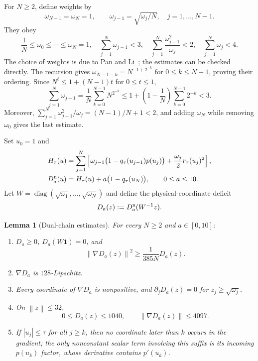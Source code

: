 \documentclass[11pt,a4paper]{article}
\newcommand{\norm}[1]{\left\lVert #1\right\rVert}
\newcommand{\one}{\mathbf 1}
\newcommand{\diag}{\operatorname{diag}}
\newtheorem{lemma}[theorem]{Lemma}
\theoremstyle{definition}
\theoremstyle{remark}
\numberwithin{equation}{section}
\begin{document}
For $N\ge2$, define weights by
\begin{equation}
 \omega_{N-1}=\omega_N=1,
 \qquad
 \omega_{j-1}=\sqrt{\omega_j/N},
 \quad j=1,\ldots,N-1.
 \label{eq:weights}
\end{equation}
They obey
\begin{equation}
 \frac1N\le\omega_0\le\cdots\le\omega_N=1,
 \quad
 \sum_{j=1}^N\omega_{j-1}<3,
 \quad
 \sum_{j=1}^N\frac{\omega_{j-1}^2}{\omega_j}<2,
 \quad
 \sum_{j=1}^N\omega_j<4.
 \label{eq:weight-ledger}
\end{equation}
The choice of weights is due to Pan and Li~\cite{panli}; the estimates
can be checked directly. The recursion gives
$\omega_{N-1-k}=N^{-1+2^{-k}}$ for $0\le k\le N-1$, proving their
ordering. Since $N^t\le1+(N-1)t$ for $0\le t\le1$,
\[
 \sum_{j=1}^N\omega_{j-1}
 =\frac1N\sum_{k=0}^{N-1}N^{2^{-k}}
 \le1+\left(1-\frac1N\right)\sum_{k=0}^{N-1}2^{-k}<3.
\]
Moreover,
$\sum_{j=1}^N\omega_{j-1}^2/\omega_j=(N-1)/N+1<2$,
and adding $\omega_N$ while removing $\omega_0$ gives the last estimate.

Set $u_0=1$ and
\begin{align}
 H_\tau(u)
 &=\sum_{j=1}^N\left[
   \omega_{j-1}\bigl(1-q_\tau(u_{j-1})p(u_j)\bigr)
   +\frac{\omega_j}{2}r_\tau(u_j)^2
 \right],
 \label{eq:Htau}\\
 D_a^{\rm n}(u)
 &=H_\tau(u)+a\bigl(1-q_\tau(u_N)\bigr),
 \qquad 0\le a\le10.
 \label{eq:Dnatural}
\end{align}
Let $W=\diag(\sqrt{\omega_1},\ldots,\sqrt{\omega_N})$ and define the physical-coordinate deficit
\begin{equation}
 D_a(z):=D_a^{\rm n}(W^{-1}z).
 \label{eq:Dphysical}
\end{equation}

\begin{lemma}[Dual-chain estimates]
\label{lem:robust-chain}
For every $N\ge2$ and $a\in[0,10]$:
\begin{enumerate}
\item $D_a\ge0$, $D_a(W\one)=0$, and
\begin{equation}
 \norm{\nabla D_a(z)}^2\ge\frac{1}{385N}D_a(z).
 \label{eq:D-PL}
\end{equation}
\item $\nabla D_a$ is $128$-Lipschitz.
\item Every coordinate of $\nabla D_a$ is nonpositive, and $\partial_jD_a(z)=0$ for $z_j\ge\sqrt{\omega_j}$.
\item On $\norm z\le32$,
\begin{equation}
 0\le D_a(z)\le1040,
 \qquad
 \norm{\nabla D_a(z)}\le4097.
 \label{eq:D-ball}
\end{equation}
\item If $|u_j|\le\tau$ for all $j\ge k$, then no coordinate later than $k$ occurs in the gradient; the only nonconstant scalar term involving this suffix is its incoming $p(u_k)$ factor, whose derivative contains $p'(u_k)$.
\end{enumerate}
\end{lemma}
\end{document}
